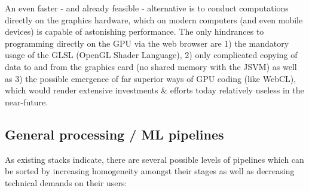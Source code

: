 An even faster - and already feasible - alternative is to conduct computations directly on the graphics hardware, which on modern computers (and even mobile devices) is capable of astonishing performance. The only hindrances to programming directly on the GPU via the web browser are 1) the mandatory usage of the GLSL (OpenGL Shader Language), 2) only complicated copying of data to and from the graphics card (no shared memory with the JSVM) as well as 3) the possible emergence of far superior ways of GPU coding (like WebCL), which would render extensive investments \& efforts today relatively useless in the near-future.


\subsection{General processing / ML pipelines}
\label{ssect:pipelines}

As existing stacks indicate, there are several possible levels of pipelines which can be sorted by increasing homogeneity amongst their stages as well as decreasing technical demands on their users:

